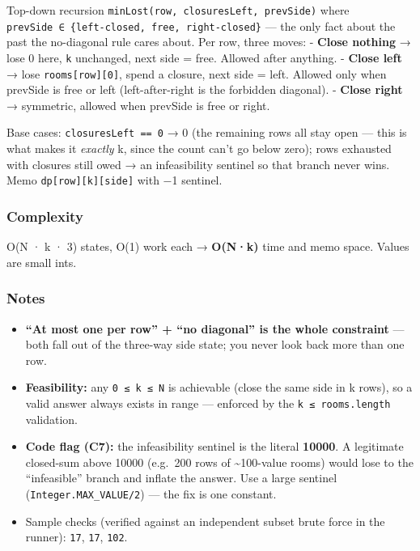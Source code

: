\documentclass[
  10pt,
  letterpaper,
  onecolumn]{article}
\providecommand{\tightlist}{%
  \setlength{\itemsep}{0pt}\setlength{\parskip}{0pt}}
\begin{document}
Top-down recursion \texttt{minLost(row,\ closuresLeft,\ prevSide)} where
\texttt{prevSide\ ∈\ \{left-closed,\ free,\ right-closed\}} --- the only
fact about the past the no-diagonal rule cares about. Per row, three
moves: - \textbf{Close nothing} → lose 0 here, \texttt{k} unchanged,
next side = free. Allowed after anything. - \textbf{Close left} → lose
\texttt{rooms{[}row{]}{[}0{]}}, spend a closure, next side = left.
Allowed only when prevSide is free or left (left-after-right is the
forbidden diagonal). - \textbf{Close right} → symmetric, allowed when
prevSide is free or right.

Base cases: \texttt{closuresLeft\ ==\ 0} → 0 (the remaining rows all
stay open --- this is what makes it \emph{exactly} k, since the count
can't go below zero); rows exhausted with closures still owed → an
infeasibility sentinel so that branch never wins. Memo
\texttt{dp{[}row{]}{[}k{]}{[}side{]}} with −1 sentinel.

\hypertarget{complexity-13}{%
\subsubsection{Complexity}\label{complexity-13}}

O(N · k · 3) states, O(1) work each → \textbf{O(N·k)} time and memo
space. Values are small ints.

\hypertarget{notes-11}{%
\subsubsection{Notes}\label{notes-11}}

\begin{itemize}
\tightlist
\item
  \textbf{``At most one per row'' + ``no diagonal'' is the whole
  constraint} --- both fall out of the three-way side state; you never
  look back more than one row.
\item
  \textbf{Feasibility:} any \texttt{0\ ≤\ k\ ≤\ N} is achievable (close
  the same side in k rows), so a valid answer always exists in range ---
  enforced by the \texttt{k\ ≤\ rooms.length} validation.
\item
  \textbf{Code flag (C7):} the infeasibility sentinel is the literal
  \textbf{10000}. A legitimate closed-sum above 10000 (e.g.~200 rows of
  \textasciitilde100-value rooms) would lose to the ``infeasible''
  branch and inflate the answer. Use a large sentinel
  (\texttt{Integer.MAX\_VALUE/2}) --- the fix is one constant.
\item
  Sample checks (verified against an independent subset brute force in
  the runner): \texttt{17}, \texttt{17}, \texttt{102}.
\end{itemize}
\end{document}
